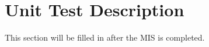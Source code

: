 \documentclass[12pt, titlepage]{article}
\begin{document}

\section{Unit Test Description}
This section will be filled in after the MIS is completed. 

%
%
%
%
%
%
%
%
%
%					
%					
%					
%
%
%					
\end{document}
